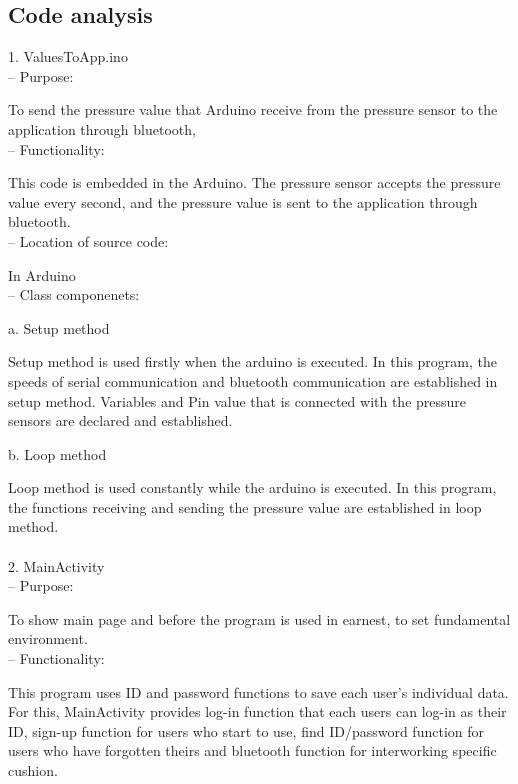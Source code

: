 \documentclass[conference]{IEEEtran}
\begin{document}
\subsection{Code analysis\\}

1. ValuesToApp.ino\\

 -- Purpose: 

To send the pressure value that Arduino receive from the pressure sensor to the application through bluetooth,\\

 --	Functionality:

This code is embedded in the Arduino. The pressure sensor accepts the pressure value every second, and the pressure value is sent to the application through bluetooth. \\

 --	Location of source code:

In Arduino\\

 --	Class componenets:

a. Setup method 

Setup method is used firstly when the arduino is executed. In this program, the speeds of serial communication and bluetooth communication are established in setup method. Variables and Pin value that is connected with the pressure sensors are declared and established. 

b. Loop method 

Loop method is used constantly while the arduino is executed. In this program, the functions receiving and sending the pressure value are established in loop method. \\\\

2. MainActivity\\

 --	Purpose:
 
To show main page and before the program is used in earnest, to set fundamental environment.\\

 --	Functionality:
 
This program uses ID and password functions to save each user’s individual data. For this, MainActivity provides log-in function that each users can log-in as their ID, sign-up function for users who start to use, find ID/password function for users who have forgotten theirs and bluetooth function for interworking specific cushion. \\
\end{document}
